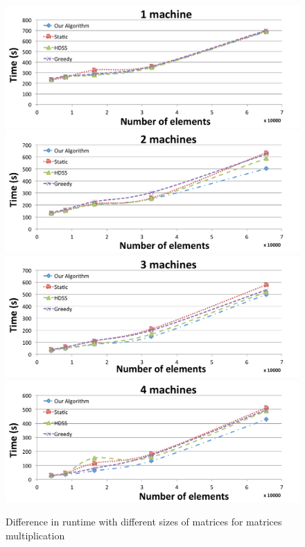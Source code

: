 \documentclass[journal]{IEEEtran}
\begin{document}
\begin{figure}[htb]
	\begin{center}
	\centering
		\includegraphics[scale=0.3]{1machine.pdf} \quad
		\includegraphics[scale=0.3]{2machines.pdf} \quad
		\includegraphics[scale=0.3]{3machines.pdf} \quad
		\includegraphics[scale=0.3]{4machines.pdf} 
	\caption{Difference in runtime with different sizes of matrices for matrices multiplication}
	\label{fig:todosJuntos}
	\end{center}
\end{figure}
\end{document}
